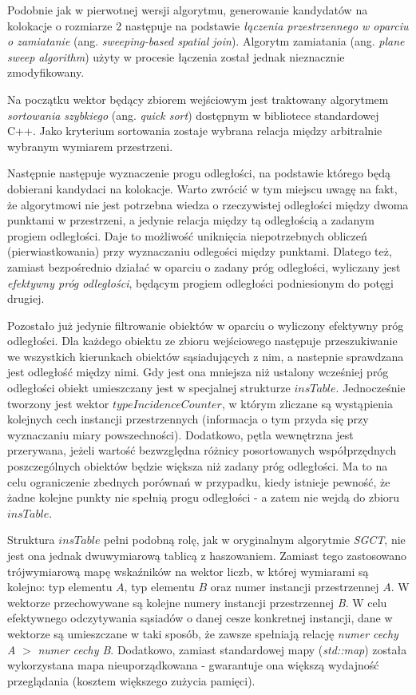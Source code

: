 \documentclass[12pt]{article}
\begin{document}
Podobnie jak w pierwotnej wersji algorytmu, generowanie kandydatów na kolokacje o rozmiarze 2 następuje na podstawie \textit{łączenia przestrzennego w oparciu o zamiatanie} (ang. \textit{sweeping-based spatial join}). Algorytm zamiatania (ang. \textit{plane sweep algorithm}) użyty w procesie łączenia został jednak nieznacznie zmodyfikowany.

Na początku wektor będący zbiorem wejściowym jest traktowany algorytmem \textit{sortowania szybkiego} (ang. \textit{quick sort}) dostępnym w bibliotece standardowej C++. Jako kryterium sortowania zostaje wybrana relacja między arbitralnie wybranym wymiarem przestrzeni.

Następnie następuje wyznaczenie progu odległości, na podstawie którego będą dobierani kandydaci na kolokacje. Warto zwrócić w tym miejscu uwagę na fakt, że algorytmowi nie jest potrzebna wiedza o rzeczywistej odległości między dwoma punktami w przestrzeni, a jedynie relacja między tą odległością a zadanym progiem odległości. Daje to możliwość uniknięcia niepotrzebnych obliczeń (pierwiastkowania) przy wyznaczaniu odlegości między punktami. Dlatego też, zamiast bezpośrednio działać w oparciu o zadany próg odległości, wyliczany jest \textit{efektywny próg odległości}, będącym progiem odległości podniesionym do potęgi drugiej. 

Pozostało już jedynie filtrowanie obiektów w oparciu o wyliczony efektywny próg odległości. Dla każdego obiektu ze zbioru wejściowego następuje przeszukiwanie we wszystkich kierunkach obiektów sąsiadujących z nim, a nastepnie sprawdzana jest odległość między nimi. Gdy jest ona mniejsza niż ustalony wcześniej próg odległości obiekt umieszczany jest w specjalnej strukturze $ insTable $. Jednocześnie tworzony jest wektor $ typeIncidenceCounter$, w którym zliczane są wystąpienia kolejnych cech instancji przestrzennych (informacja o tym przyda się przy wyznaczaniu miary powszechności). Dodatkowo, pętla wewnętrzna jest przerywana, jeżeli wartość bezwzględna różnicy posortowanych współprzędnych poszczególnych obiektów będzie większa niż zadany próg odległości. Ma to na celu ograniczenie zbednych porównań w przypadku, kiedy istnieje pewność, że żadne kolejne punkty nie spełnią progu odległości - a zatem nie wejdą do zbioru $ insTable $.
 
Struktura $ insTable $ pełni podobną rolę, jak w oryginalnym algorytmie \textit{SGCT}, nie jest ona jednak dwuwymiarową tablicą z haszowaniem. Zamiast tego zastosowano trójwymiarową mapę wskaźników na wektor liczb, w której wymiarami są kolejno: typ elementu $ A $, typ elementu $ B $ oraz numer instancji przestrzennej $ A $.  W wektorze przechowywane są kolejne numery instancji przestrzennej \textit{B}. W celu efektywnego odczytywania sąsiadów o danej cesze konkretnej instancji, dane w wektorze są umieszczane w taki sposób, że zawsze spełniają relację \textit{numer cechy A} $ > $ \textit{numer cechy B}. Dodatkowo, zamiast standardowej mapy (\textit{std::map}) została wykorzystana mapa nieuporządkowana - gwarantuje ona większą wydajność przeglądania (kosztem większego zużycia pamięci).
\end{document}
